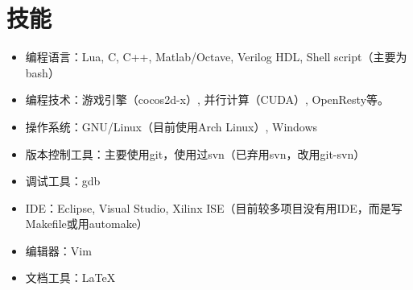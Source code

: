 \documentclass[letterpaper]{article}
\begin{document}
\section*{技能}
\begin{itemize}
    \item 编程语言：Lua, C, C++, Matlab/Octave, Verilog HDL, Shell script（主要为bash）
    \item 编程技术：游戏引擎（cocos2d-x）, 并行计算（CUDA）, OpenResty等。
    \item 操作系统：GNU/Linux（目前使用Arch Linux）, Windows
    \item 版本控制工具：主要使用git，使用过svn（已弃用svn，改用git-svn）
    \item 调试工具：gdb
    \item IDE：Eclipse, Visual Studio, Xilinx ISE（目前较多项目没有用IDE，而是写Makefile或用automake）
    \item 编辑器：Vim
    \item 文档工具：\LaTeX
\end{itemize}
\end{document}

